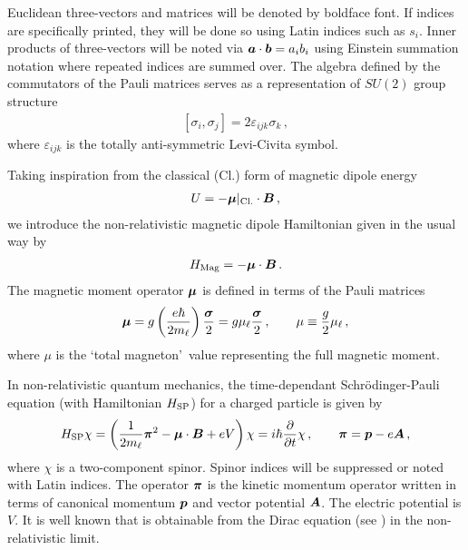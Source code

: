Euclidean three-vectors and matrices will be denoted by boldface font. If indices are specifically printed, they will be done so using Latin indices such as $s_{i}$. Inner products of three-vectors will be noted via $\boldsymbol{a}\cdot\boldsymbol{b}=a_{i}b_{i}$ using Einstein summation notation where repeated indices are summed over. The algebra defined by the commutators of the Pauli matrices serves as a representation of $SU(2)$ group structure
\begin{align}
    \label{pauli:1}
    [\sigma_{i},\sigma_{j}] = 2\varepsilon_{ijk}\sigma_{k}\,,
\end{align}
where $\varepsilon_{ijk}$ is the totally anti-symmetric Levi-Civita symbol.

Taking inspiration from the classical (Cl.) form of magnetic dipole energy
\begin{align}
    \label{magenergy:1}
    U=-\boldsymbol{\mu}\vert_{\rm Cl.}\cdot\boldsymbol{B}\,,
\end{align}
we introduce the non-relativistic magnetic dipole Hamiltonian given in the usual way by
\begin{align}
	\label{mag:2}
    {H}_{\mathrm{Mag}}=-\boldsymbol{\mu}\cdot\boldsymbol{B}\,.
\end{align}
The magnetic moment operator $\boldsymbol{\mu}$ is defined in terms of the Pauli matrices
\begin{align}
    \label{mag:3}
    \boldsymbol{\mu}=g\left(\frac{e\hbar}{2m_{\ell}}\right)\frac{\boldsymbol{\sigma}}{2}=g\mu_{\ell}\frac{\boldsymbol{\sigma}}{2}\,,\qquad\mu\equiv\frac{g}{2}\mu_{\ell}\,,
\end{align}
where $\mu$ is the \lq total magneton\rq\ value representing the full magnetic moment.

In non-relativistic quantum mechanics, the time-dependant Schr{\"o}dinger-Pauli equation (with Hamiltonian $H_{\rm SP}$) for a charged particle is given by
\begin{align}
	\label{sp:1}
    {H}_{\mathrm{SP}}\chi=\left(\frac{1}{2m_{\ell}}\boldsymbol{\pi}^{2}-\boldsymbol{\mu}\cdot\boldsymbol{B}+e{ V}\right)\chi=i\hbar\frac{\partial}{\partial t}\chi\,,\qquad
    \boldsymbol{\pi}=\boldsymbol{ p}-e{\boldsymbol{A}}\,,
\end{align}
where $\chi$ is a two-component spinor. Spinor indices will be suppressed or noted with Latin indices. The operator $\boldsymbol{\pi}$ is the kinetic momentum operator written in terms of canonical momentum $\boldsymbol{p}$ and vector potential $\boldsymbol{A}$. The electric potential is $V$. It is well known that  is obtainable from the Dirac equation (see ) in the non-relativistic limit.

